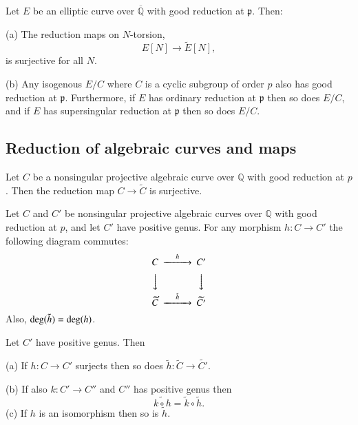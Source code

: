 \begin{proposition}
    Let $E$ be an elliptic curve over $\overline{\mathbb{Q}}$ with good reduction at $\mathfrak{p}$. Then: \par
    (a) The reduction maps on $N$-torsion, 
    \begin{equation*}
        E[N]\longrightarrow\tilde{E}[N],
    \end{equation*}
    is surjective for all $N$.\par
    (b) Any isogenous $E/C$ where $C$ is a cyclic subgroup of order $p$ also has good reduction at $\mathfrak{p}$.
    Furthermore, if $E$ has ordinary reduction at $\mathfrak{p}$ then so does $E/C$, and if $E$ has supersingular 
    reduction at $\mathfrak{p}$ then so does $E/C$.
\end{proposition}

\subsection{Reduction of algebraic curves and maps}
\begin{theorem}
    Let $C$ be a nonsingular projective algebraic curve over $\mathbb{Q}$ with good reduction at $p$.
    Then the reduction map $C\longrightarrow \widetilde{C}$ is surjective.
\end{theorem}
\begin{theorem}
    Let $C$ and $C'$ be nonsingular projective algebraic curves over $\mathbb{Q}$ with good reduction at $p$, 
    and let $C'$ have positive genus. For any morphism $h:C\longrightarrow C'$ the following diagram commutes:
    $$\begin{CD}
       C @>h>>  C' \\
       @VVV @VVV \\
       \widetilde{C} @>\tilde{h}>> \widetilde{C'}
    \end{CD}$$
    Also, ${\rm deg}(\tilde{h})={\rm deg}(h)$.
\end{theorem}

\begin{corollary}
    Let $C'$ have positive genus. Then \par
    (a) If $h:C\longrightarrow C'$ surjects then so does $\tilde{h}:\widetilde{C}\longrightarrow \widetilde{C'}$.\par
    (b) If also $k:C'\longrightarrow C''$ and $C''$ has positive genus then 
    \begin{equation*}
        \widetilde{k\circ h}=\tilde{k}\circ \tilde{h}.
    \end{equation*}
    (c) If $h$ is an isomorphism then so is $\tilde{h}$.
\end{corollary}

